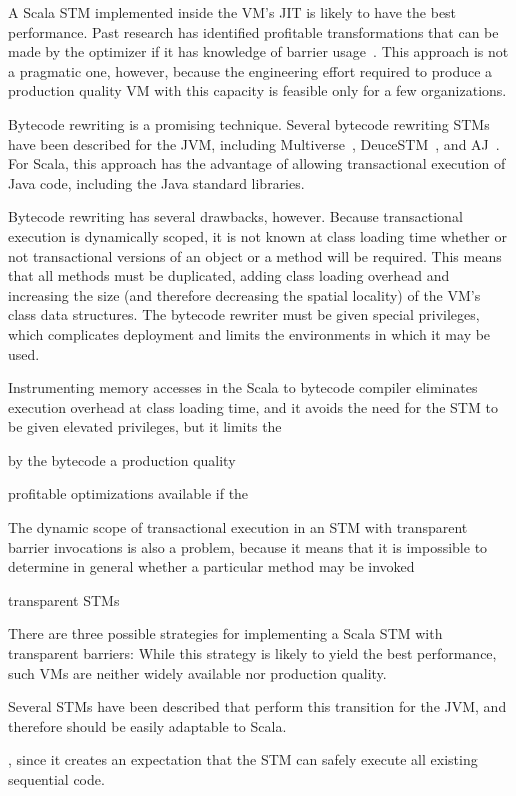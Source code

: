 A Scala STM implemented inside the VM's JIT is likely to have the best
performance.  Past research has identified profitable transformations
that can be made by the optimizer if it has knowledge of barrier
usage~\cite{?}.  This approach is not a pragmatic one, however, because
the engineering effort required to produce a production quality VM with
this capacity is feasible only for a few organizations.

Bytecode rewriting is a promising technique.  Several bytecode rewriting STMs
have been described for the JVM, including Multiverse~\cite{multiversewebsite},
DeuceSTM~\cite{??}, and AJ~\cite{popl09bronson}.  For Scala, this approach
has the advantage of allowing transactional execution of Java code,
including the Java standard libraries.

Bytecode rewriting has several drawbacks, however.  Because transactional
execution is dynamically scoped, it is not known at class loading time
whether or not transactional versions of an object or a method will
be required.  This means that all methods must be duplicated, adding
class loading overhead and increasing the size (and therefore decreasing
the spatial locality) of the VM's class data structures.  The bytecode
rewriter must be given special privileges, which complicates deployment
and limits the environments in which it may be used.

Instrumenting memory accesses in the Scala to bytecode compiler eliminates
execution overhead at class loading time, and it avoids the need for the STM to
be given elevated privileges, but it limits the 

by the bytecode 
a production quality 

profitable optimizations available
if the 

The dynamic scope of transactional execution in an STM with transparent barrier
invocations is also a problem, because it means that it is impossible to
determine in general whether a particular method may be invoked

transparent STMs

There are three possible strategies for implementing a Scala STM with
transparent barriers:
While this strategy is likely to yield
the best performance, such VMs are neither widely available nor production
quality.

Several STMs have been
described that perform this transition for the JVM, and therefore should be
easily adaptable to Scala.

, since it creates an expectation that the STM can
safely execute all existing sequential code.

